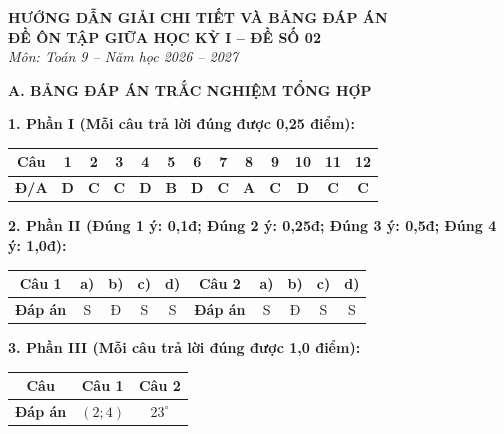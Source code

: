 \documentclass[12pt,a4paper]{article}
\begin{document}
\begin{center}
  \textbf{\Large HƯỚNG DẪN GIẢI CHI TIẾT VÀ BẢNG ĐÁP ÁN}\\
  \textbf{\large ĐỀ ÔN TẬP GIỮA HỌC KỲ I -- ĐỀ SỐ 02}\\
  \textit{Môn: Toán 9 -- Năm học 2026 -- 2027}
\end{center}
\vspace{2mm}

\noindent\textbf{\large A. BẢNG ĐÁP ÁN TRẮC NGHIỆM TỔNG HỢP}
\vspace{1mm}

\noindent\textbf{1. Phần I (Mỗi câu trả lời đúng được 0,25 điểm):}
\begin{center}
\begin{tabular}{|c|c|c|c|c|c|c|c|c|c|c|c|c|}
\hline
\textbf{Câu} & \textbf{1} & \textbf{2} & \textbf{3} & \textbf{4} & \textbf{5} & \textbf{6} & \textbf{7} & \textbf{8} & \textbf{9} & \textbf{10} & \textbf{11} & \textbf{12} \\
\hline
\textbf{Đ/A} & \textbf{D} & \textbf{C} & \textbf{C} & \textbf{D} & \textbf{B} & \textbf{D} & \textbf{C} & \textbf{A} & \textbf{C} & \textbf{D} & \textbf{C} & \textbf{C} \\
\hline
\end{tabular}
\end{center}
\vspace{0.5mm}

\noindent\textbf{2. Phần II (Đúng 1 ý: 0,1đ; Đúng 2 ý: 0,25đ; Đúng 3 ý: 0,5đ; Đúng 4 ý: 1,0đ):}
\begin{center}
\begin{tabular}{|c|c|c|c|c||c|c|c|c|c|}
\hline
\textbf{Câu 1} & \textbf{a)} & \textbf{b)} & \textbf{c)} & \textbf{d)} & \textbf{Câu 2} & \textbf{a)} & \textbf{b)} & \textbf{c)} & \textbf{d)} \\
\hline
\textbf{Đáp án} & S & Đ & S & S & \textbf{Đáp án} & S & Đ & S & S \\
\hline
\end{tabular}
\end{center}
\vspace{0.5mm}

\noindent\textbf{3. Phần III (Mỗi câu trả lời đúng được 1,0 điểm):}
\begin{center}
\begin{tabular}{|c|c|c|}
\hline
\textbf{Câu} & \textbf{Câu 1} & \textbf{Câu 2} \\
\hline
\textbf{Đáp án} & $(2; 4)$ & $23^\circ$ \\
\hline
\end{tabular}
\end{center}
\vspace{2mm}
\end{document}
